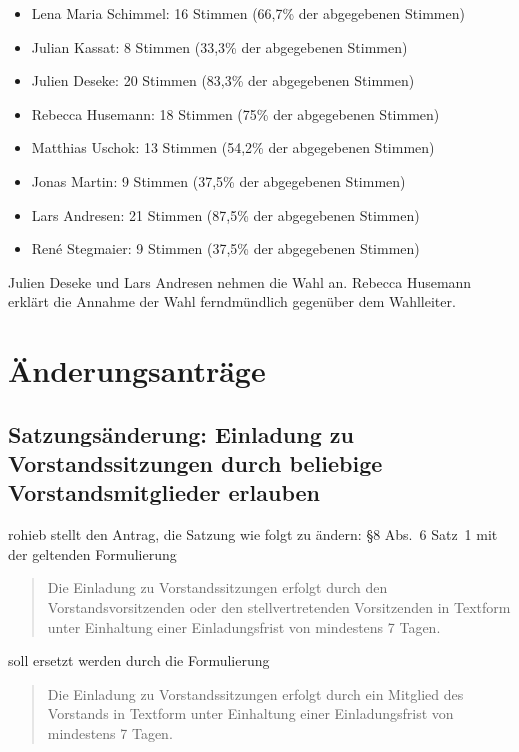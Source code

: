 \documentclass[a4paper,12pt]{scrartcl}
\begin{document}
\begin{itemize}
  \item Lena Maria Schimmel: 16 Stimmen (66{,}7\% der abgegebenen Stimmen)
  \item Julian Kassat: 8 Stimmen (33{,}3\% der abgegebenen Stimmen)
  \item Julien Deseke: 20 Stimmen (83{,}3\% der abgegebenen Stimmen)
  \item Rebecca Husemann: 18 Stimmen (75\% der abgegebenen Stimmen)
  \item Matthias Uschok: 13 Stimmen (54{,}2\% der abgegebenen Stimmen)
  \item Jonas Martin: 9 Stimmen (37{,}5\% der abgegebenen Stimmen)
  \item Lars Andresen: 21 Stimmen (87{,}5\% der abgegebenen Stimmen)
  \item René Stegmaier: 9 Stimmen (37{,}5\% der abgegebenen Stimmen)
\end{itemize}

Julien Deseke und Lars Andresen nehmen die Wahl an. Rebecca Husemann erklärt die
Annahme der Wahl ferndmündlich gegenüber dem Wahlleiter.

\section{Änderungsanträge}

\subsection{Satzungsänderung: Einladung zu Vorstandssitzungen durch beliebige
Vorstandsmitglieder erlauben}

rohieb stellt den Antrag, die Satzung wie folgt zu ändern: §8 Abs.~6 Satz~1 mit
der geltenden Formulierung
\begin{quote}
  Die Einladung zu Vorstandssitzungen erfolgt durch den Vorstandsvorsitzenden
  oder den stellvertretenden Vorsitzenden in Textform unter Einhaltung einer
  Einladungsfrist von mindestens 7 Tagen.
\end{quote}
soll ersetzt werden durch die Formulierung
\begin{quote}
  Die Einladung zu Vorstandssitzungen erfolgt durch ein Mitglied des Vorstands
  in Textform unter Einhaltung einer Einladungsfrist von mindestens 7 Tagen.
\end{quote}
\end{document}
